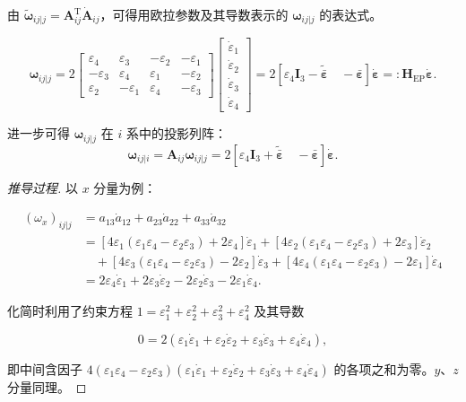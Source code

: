 由 $\tilde{\boldsymbol{\omega}}_{ij|j}=\boldsymbol{A}_{ij}^{\mathrm{T}}\dot{\boldsymbol{A}}_{ij}$，可得用欧拉参数及其导数表示的 $\boldsymbol{\omega}_{ij|j}$ 的表达式。
\begin{theorem}[欧拉参数表示的角速度]
\[
\boldsymbol{\omega}_{ij|j}=2
\begin{bmatrix}
\varepsilon_4 & \varepsilon_3 & -\varepsilon_2 & -\varepsilon_1\\
-\varepsilon_3 & \varepsilon_4 & \varepsilon_1 & -\varepsilon_2\\
\varepsilon_2 & -\varepsilon_1 & \varepsilon_4 & -\varepsilon_3
\end{bmatrix}
\begin{bmatrix}
\dot{\varepsilon}_1\\ \dot{\varepsilon}_2\\ \dot{\varepsilon}_3\\ \dot{\varepsilon}_4
\end{bmatrix}
=2\left[\varepsilon_4\boldsymbol{I}_3-\tilde{\bar{\boldsymbol{\varepsilon}}}\quad -\bar{\boldsymbol{\varepsilon}}\right]\dot{\boldsymbol{\varepsilon}}
=:\boldsymbol{H}_{\mathrm{EP}}\dot{\boldsymbol{\varepsilon}}.
\]
\end{theorem}
进一步可得 $\boldsymbol{\omega}_{ij|j}$ 在 $i$ 系中的投影列阵：
\[
\boldsymbol{\omega}_{ij|i}=\boldsymbol{A}_{ij}\boldsymbol{\omega}_{ij|j}
=2\left[\varepsilon_4\boldsymbol{I}_3+\tilde{\bar{\boldsymbol{\varepsilon}}}\quad -\bar{\boldsymbol{\varepsilon}}\right]\dot{\boldsymbol{\varepsilon}}.
\]
\begin{proof}[推导过程]
以 $x$ 分量为例：

\[
\begin{aligned}
(\omega_x)_{ij|j} &= a_{13}\dot{a}_{12}+a_{23}\dot{a}_{22}+a_{33}\dot{a}_{32}\\
&= \left[4\varepsilon_1(\varepsilon_1\varepsilon_4-\varepsilon_2\varepsilon_3)+2\varepsilon_4\right]\dot{\varepsilon}_1
+ \left[4\varepsilon_2(\varepsilon_1\varepsilon_4-\varepsilon_2\varepsilon_3)+2\varepsilon_3\right]\dot{\varepsilon}_2\\
&\quad + \left[4\varepsilon_3(\varepsilon_1\varepsilon_4-\varepsilon_2\varepsilon_3)-2\varepsilon_2\right]\dot{\varepsilon}_3
+ \left[4\varepsilon_4(\varepsilon_1\varepsilon_4-\varepsilon_2\varepsilon_3)-2\varepsilon_1\right]\dot{\varepsilon}_4\\
&= 2\varepsilon_4\dot{\varepsilon}_1+2\varepsilon_3\dot{\varepsilon}_2-2\varepsilon_2\dot{\varepsilon}_3-2\varepsilon_1\dot{\varepsilon}_4.
\end{aligned}
\]

化简时利用了约束方程 $1=\varepsilon_1^2+\varepsilon_2^2+\varepsilon_3^2+\varepsilon_4^2$ 及其导数

\[
0=2(\varepsilon_1\dot{\varepsilon}_1+\varepsilon_2\dot{\varepsilon}_2+\varepsilon_3\dot{\varepsilon}_3+\varepsilon_4\dot{\varepsilon}_4),
\]

即中间含因子 $4(\varepsilon_1\varepsilon_4-\varepsilon_2\varepsilon_3)(\varepsilon_1\dot{\varepsilon}_1+\varepsilon_2\dot{\varepsilon}_2+\varepsilon_3\dot{\varepsilon}_3+\varepsilon_4\dot{\varepsilon}_4)$ 的各项之和为零。$y$、$z$ 分量同理。
\end{proof}
